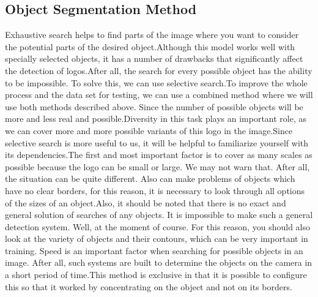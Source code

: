 \subsection{Object Segmentation Method}\label{sec:4.2.1}
\par Exhaustive search helps to find parts of the image where you want to consider the potential parts of the desired object.Although this model works well with specially selected objects, it has a number of drawbacks that significantly affect the detection of logos.After all, the search for every possible object has the ability to be impossible. To solve this, we can use selective search.To improve the whole process and the data set for testing, we can use a combined method where we will use both methods described above. Since the number of possible objects will be more and less real and possible.Diversity in this task plays an important role, as we can cover more and more possible variants of this logo in the image.Since selective search is more useful to us, it will be helpful to familiarize yourself with its dependencies.The first and most important factor is to cover as many scales as possible because the logo can be small or large. We may not warn that. After all, the situation can be quite different. Also can make problems of objects which have no clear borders, for this reason, it is necessary to look through all options of the sizes of an object.Also, it should be noted that there is no exact and general solution of searches of any objects. It is impossible to make such a general detection system. Well, at the moment of course. For this reason, you should also look at the variety of objects and their contours, which can be very important in training. Speed is an important factor when searching for possible objects in an image. After all, such systems are built to determine the objects on the camera in a short period of time.This method is exclusive in that it is possible to configure this so that it worked by concentrating on the object and not on its borders.\cite{ssForSegmentation}


